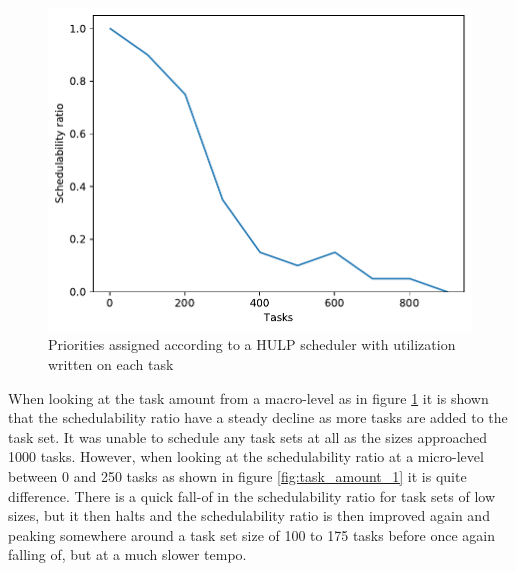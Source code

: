 \documentclass{kththesis}
\begin{document}
\begin{figure}[H]

    \centering

    \includegraphics[width=1.0\linewidth]{images/task_amount_2.pdf}

    \caption{Priorities assigned according to a HULP scheduler with utilization written on each task}

    \label{fig:task_amount_2}

\end{figure}

When looking at the task amount from a macro-level as in figure \ref{fig:task_amount_2} it is shown
that the schedulability ratio have a steady decline as more tasks are added to the task set. It was
unable to schedule any task sets at all as the sizes approached 1000 tasks. However, when looking at
the schedulability ratio at a micro-level between 0 and 250 tasks as shown in figure
\ref{fig:task_amount_1} it is quite difference. There is a quick fall-of in the schedulability ratio
for task sets of low sizes, but it then halts and the schedulability ratio is then improved again
and peaking somewhere around a task set size of 100 to 175 tasks before once again falling of, but
at a much slower tempo.
\end{document}
